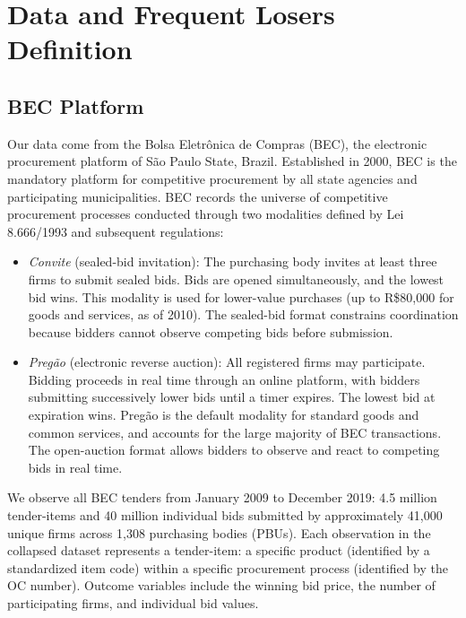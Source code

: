 \section{Data and Frequent Losers Definition}
\label{sec:data}

\subsection{BEC Platform}

Our data come from the Bolsa Eletr\^{o}nica de Compras (BEC), the electronic procurement platform of S\~{a}o Paulo State, Brazil. Established in 2000, BEC is the mandatory platform for competitive procurement by all state agencies and participating municipalities. BEC records the universe of competitive procurement processes conducted through two modalities defined by Lei 8.666/1993 and subsequent regulations:

\begin{itemize}
\item \textit{Convite} (sealed-bid invitation): The purchasing body invites at least three firms to submit sealed bids. Bids are opened simultaneously, and the lowest bid wins. This modality is used for lower-value purchases (up to R\$80,000 for goods and services, as of 2010). The sealed-bid format constrains coordination because bidders cannot observe competing bids before submission.

\item \textit{Preg\~{a}o} (electronic reverse auction): All registered firms may participate. Bidding proceeds in real time through an online platform, with bidders submitting successively lower bids until a timer expires. The lowest bid at expiration wins. Preg\~{a}o is the default modality for standard goods and common services, and accounts for the large majority of BEC transactions. The open-auction format allows bidders to observe and react to competing bids in real time.
\end{itemize}

We observe all BEC tenders from January 2009 to December 2019: 4.5 million tender-items and 40 million individual bids submitted by approximately 41,000 unique firms across 1,308 purchasing bodies (PBUs). Each observation in the collapsed dataset represents a tender-item: a specific product (identified by a standardized item code) within a specific procurement process (identified by the OC number). Outcome variables include the winning bid price, the number of participating firms, and individual bid values.


